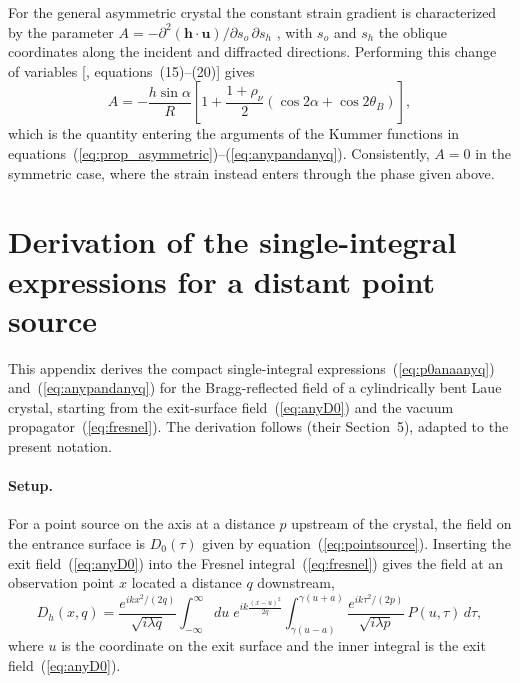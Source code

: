 \documentclass[preprint]{iucr}              %
\begin{document}
For the general asymmetric crystal the constant strain gradient is characterized by the parameter $A=-\partial^{2}(\mathbf{h}\cdot\mathbf{u})/\partial s_{o}\,\partial s_{h}$ \cite{authierbook}, with $s_{o}$ and $s_{h}$ the oblique coordinates along the incident and diffracted directions. Performing this change of variables [\cite{GuigayFerrero2016}, equations~(15)--(20)] gives
\begin{equation}
A=-\frac{h\sin\alpha}{R}
\left[1+\frac{1+\rho_\nu}{2}\left(\cos 2\alpha+\cos 2\theta_{B}\right)\right],
\end{equation}
which is the quantity entering the arguments of the Kummer functions in equations~(\ref{eq:prop_asymmetric})--(\ref{eq:anypandanyq}). Consistently, $A=0$ in the symmetric case, where the strain instead enters through the phase given above.


\section{Derivation of the single-integral expressions for a distant point source}
\label{app:singleintegral}

This appendix derives the compact single-integral expressions~(\ref{eq:p0anaanyq}) and~(\ref{eq:anypandanyq}) for the Bragg-reflected field of a cylindrically bent Laue crystal, starting from the exit-surface field~(\ref{eq:anyD0}) and the vacuum propagator~(\ref{eq:fresnel}). The derivation follows \cite{GuigayFerrero2016} (their Section~5), adapted to the present notation.

\paragraph*{Setup.}
For a point source on the axis at a distance $p$ upstream of the crystal, the field on the entrance surface is $D_0(\tau)$ given by equation~(\ref{eq:pointsource}). Inserting the exit field~(\ref{eq:anyD0}) into the Fresnel integral~(\ref{eq:fresnel}) gives the field at an observation point $x$ located a distance $q$ downstream,
\begin{equation}\label{eq:appB_start}
D_h(x,q)=\frac{e^{ikx^2/(2q)}}{\sqrt{i\lambda q}}\int_{-\infty}^{\infty}\!\!du\;e^{ik\frac{(x-u)^2}{2q}}\int_{\gamma(u-a)}^{\gamma(u+a)}\frac{e^{ik\tau^2/(2p)}}{\sqrt{i\lambda p}}\,P(u,\tau)\,d\tau,
\end{equation}
where $u$ is the coordinate on the exit surface and the inner integral is the exit field~(\ref{eq:anyD0}).
\end{document}
